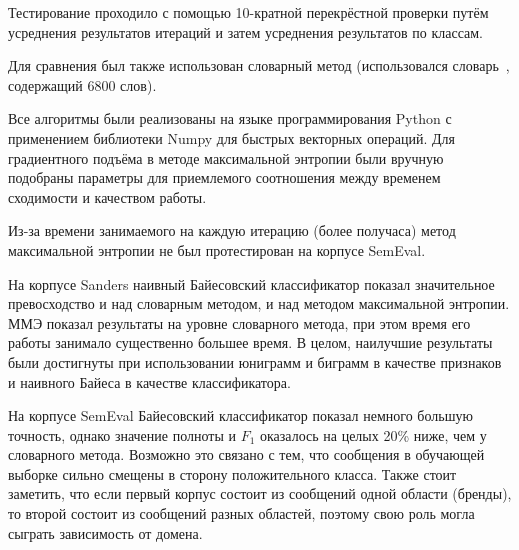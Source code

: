 Тестирование проходило с помощью 10-кратной перекрёстной проверки
путём усреднения результатов итераций и затем усреднения результатов по 
классам.

Для сравнения был также использован словарный метод (использовался словарь~\cite{dictionary}, содержащий 6800 слов).

Все алгоритмы были реализованы на языке программирования Python
с применением библиотеки Numpy для быстрых векторных операций.
Для градиентного подъёма в методе максимальной энтропии
были вручную подобраны параметры для приемлемого соотношения
между временем сходимости и качеством работы. 

Из-за времени занимаемого на каждую итерацию (более получаса) метод 
максимальной энтропии не был протестирован на корпусе SemEval. 

На корпусе Sanders наивный Байесовский классификатор показал значительное
превосходство и над словарным методом, и над методом максимальной энтропии.
ММЭ показал результаты на уровне словарного метода, при этом время его работы
занимало существенно большее время. В целом, наилучшие результаты были достигнуты при использовании юниграмм и биграмм в качестве признаков и наивного Байеса в качестве классификатора.

На корпусе SemEval Байесовский классификатор показал немного большую 
точность, однако значение полноты и $F_1$ оказалось на целых 20\% ниже, 
чем у словарного метода. Возможно это связано с тем, что сообщения
в обучающей выборке сильно смещены в сторону положительного класса.
Также стоит заметить, что если первый корпус состоит из сообщений одной области (бренды), 
то второй состоит из сообщений разных областей, поэтому свою роль
могла сыграть зависимость от домена.